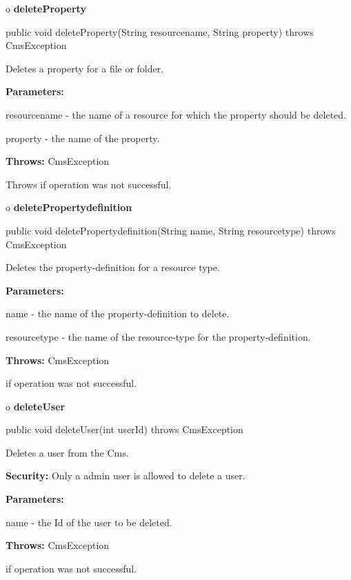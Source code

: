 o {\bf deleteProperty}

\begin{PRE}
 public void deleteProperty(String resourcename,
                            String property) throws CmsException
\end{PRE}

\begin{description}
\htmlDD Deletes a property for a file or folder.

\begin{description}
\item {\bf Parameters:}

resourcename - the name of a resource for which the property should be
deleted.

property - the name of the property.
\item {\bf Throws:} CmsException

Throws if operation was not successful.
\end{description}

\end{description}

o {\bf deletePropertydefinition}

\begin{PRE}
 public void deletePropertydefinition(String name,
                                      String resourcetype) throws CmsException
\end{PRE}

\begin{description}
\htmlDD Deletes the property-definition for a resource type.

\begin{description}
\item {\bf Parameters:}

name - the name of the property-definition to delete.

resourcetype - the name of the resource-type for the property-definition.
\item {\bf Throws:} CmsException

if operation was not successful.
\end{description}

\end{description}

o {\bf deleteUser}

\begin{PRE}
 public void deleteUser(int userId) throws CmsException
\end{PRE}

\begin{description}
\htmlDD Deletes a user from the Cms.

{\bf Security:} Only a admin user is allowed to delete a user.

\begin{description}
\item {\bf Parameters:}

name - the Id of the user to be deleted.
\item {\bf Throws:} CmsException

if operation was not successful.
\end{description}

\end{description}

